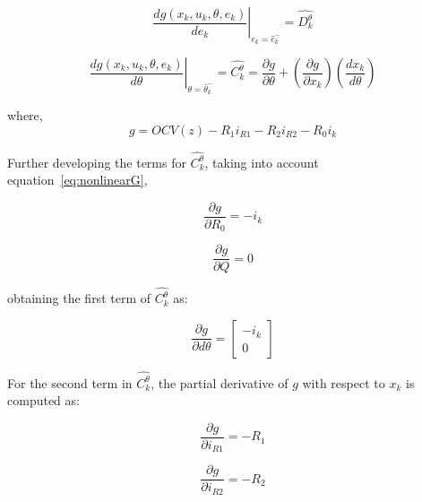 
\begin{equation}
    \left. \frac{dg(x_k, u_k, \theta, e_k)}{de_k} \right|_{e_k = \hat{e}_k^-} = \hat{D_k^\theta}
    \label{eq:DefinitionOfDtheta}
\end{equation}

\begin{equation}
    \left. \frac{dg(x_k, u_k, \theta, e_k)}{d\theta} \right|_{\theta = \hat{\theta}_k^-} = \hat{C_k^\theta} = 
    \frac{\partial g}{\partial \theta} + (\frac{\partial g}{\partial x_k})(\frac{d x_k}{d \theta})
    \label{eq:DefinitionOfCtheta}
\end{equation}

where, 
\begin{equation}
    g = OCV(z) -R_1 i_{R1} - R_2 i_{R2} - R_0 i_k
    \label{eq:nonlinearG}
\end{equation}

Further developing the terms for $\hat{C_k^\theta}$, taking into account equation~\ref{eq:nonlinearG},

\begin{equation}
    \frac{\partial g}{\partial R_0} = - i_k
\end{equation}

\begin{equation}
    \frac{\partial g}{\partial Q} = 0
\end{equation}

obtaining the first term of $\hat{C_k^\theta}$ as:

\begin{equation}
    \frac{\partial g}{\partial d\theta} = 
    \begin{bmatrix}
        - i_k \\
        0
    \end{bmatrix}
\end{equation}

For the second term in $\hat{C_k^\theta}$, the partial derivative of $g$ with respect to $x_k$ is computed as:

\begin{equation}
    \frac{\partial g}{\partial i_{R1}} = - R_1
\end{equation}

\begin{equation}
    \frac{\partial g}{\partial i_{R2}} = -R_2
\end{equation}

